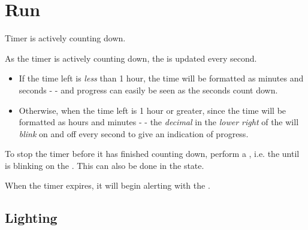 \section{Run} 

Timer is actively counting down.

\par\medskip

As the timer is actively counting down, the  is updated every second.

\begin{itemize}[leftmargin=*]
  \item If the time left is \textit{less} than \num{1} hour, the time will be
    formatted as minutes and seconds -  - and progress can easily be
    seen as the seconds count down.
  \item Otherwise, when the time left is \num{1} hour or greater, since the time
    will be formatted as hours and minutes -  - the \textit{decimal}
    in the \textit{lower right} of the  will \textit{blink} on and off
    every second to give an indication of progress.
\end{itemize}

To stop the timer before it has finished counting down, perform a ,
i.e.  the  until \symD{<<<<} is blinking on the .  This
can also be done in the  state.


When the timer expires, it will begin alerting with the .


\subsection{Lighting} \label{Timer - Lighting}

